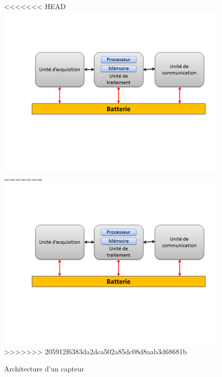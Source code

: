  \begin{figure}[h]
\centering
<<<<<<< HEAD
\includegraphics[scale=0.6]{Intro/archiCapteur}
=======
\includegraphics[scale=0.5]{Intro/archiCapteur}
>>>>>>> 205912f6383da2dca502a85dc08d8aab3d68681b
\caption{\label{archiCapteur} Architecture d’un capteur}
\end{figure}
 
